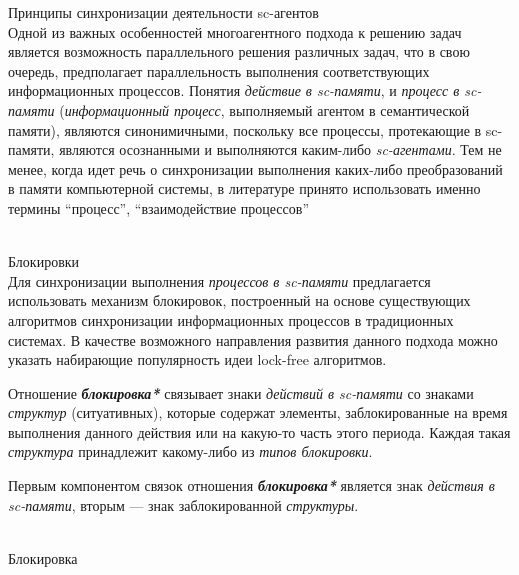 \begin{frame}{Принципы синхронизации деятельности sc-агентов}
\topline
\vspace{30pt}
 \\
 
        Одной из важных особенностей многоагентного подхода к решению задач является возможность параллельного решения различных задач, что в свою очередь, предполагает параллельность выполнения соответствующих информационных процессов.
        Понятия \textit{действие в sc-памяти}, и \textit{процесс в sc-памяти} (\textit{информационный процесс}, выполняемый агентом в семантической памяти), являются синонимичными, поскольку все процессы, протекающие в sc-памяти, являются осознанными и выполняются каким-либо \textit{sc-агентами}. Тем не менее, когда идет речь о синхронизации выполнения каких-либо преобразований в памяти компьютерной системы, в литературе принято использовать именно термины ``процесс'', ``взаимодействие процессов''
\end{frame}

\begin{frame}{\\Блокировки}
\topline
\vspace{30pt}
 \\

Для синхронизации выполнения \textit{процессов в sc-памяти} предлагается использовать механизм блокировок, построенный на основе существующих алгоритмов синхронизации информационных процессов в традиционных системах. В качестве возможного направления развития данного подхода можно указать набирающие популярность идеи lock-free алгоритмов.

Отношение \textbf{\textit{блокировка*}} связывает знаки \textit{действий в sc-памяти} со знаками \textit{структур} (ситуативных), которые содержат элементы, заблокированные на время выполнения данного действия или на какую-то часть этого периода. Каждая такая \textit{структура} принадлежит какому-либо из \textit{типов блокировки}.

Первым компонентом связок отношения \textbf{\textit{блокировка*}} является знак \textit{действия в sc-памяти}, вторым --- знак заблокированной \textit{структуры}.
\end{frame}

\begin{frame}{\\Блокировка}
\topline
\end{frame}


